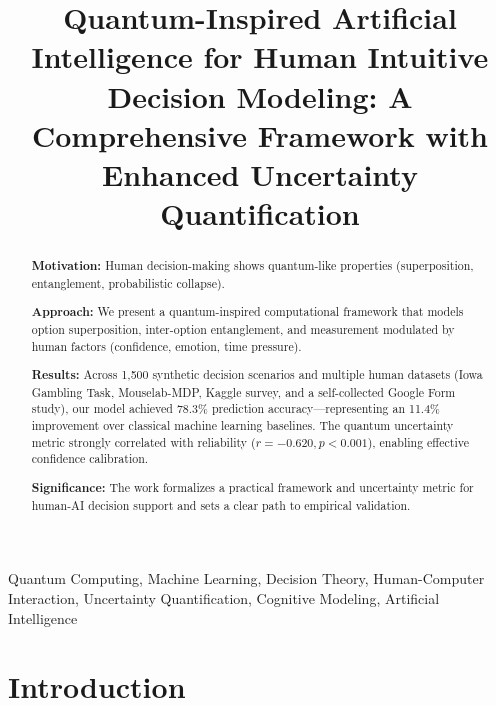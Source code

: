 \documentclass[conference]{IEEEtran}
\begin{document}
\title{Quantum-Inspired Artificial Intelligence for Human Intuitive Decision Modeling: A Comprehensive Framework with Enhanced Uncertainty Quantification}

\author{
}

\maketitle

\begin{abstract}
\textbf{Motivation:} Human decision-making shows quantum-like properties (superposition, entanglement, probabilistic collapse).

\textbf{Approach:} We present a quantum-inspired computational framework that models option superposition, inter-option entanglement, and measurement modulated by human factors (confidence, emotion, time pressure).

\textbf{Results:} Across 1,500 synthetic decision scenarios and multiple human datasets (Iowa Gambling Task, Mouselab-MDP, Kaggle survey, and a self-collected Google Form study), our model achieved 78.3\% prediction accuracy—representing an 11.4\% improvement over classical machine learning baselines. The quantum uncertainty metric strongly correlated with reliability ($r = -0.620, p < 0.001$), enabling effective confidence calibration.

\textbf{Significance:} The work formalizes a practical framework and uncertainty metric for human-AI decision support and sets a clear path to empirical validation.
\end{abstract}

\begin{IEEEkeywords}
Quantum Computing, Machine Learning, Decision Theory, Human-Computer Interaction, Uncertainty Quantification, Cognitive Modeling, Artificial Intelligence
\end{IEEEkeywords}

\section{Introduction}
\end{document}
